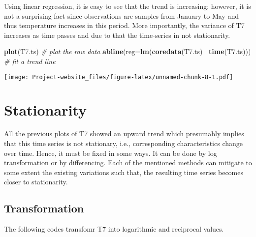 \documentclass[]{article}
\newenvironment{Shaded}{\begin{snugshade}}{\end{snugshade}}
\newcommand{\KeywordTok}[1]{\textcolor[rgb]{0.13,0.29,0.53}{\textbf{#1}}}
\newcommand{\DataTypeTok}[1]{\textcolor[rgb]{0.13,0.29,0.53}{#1}}
\newcommand{\CommentTok}[1]{\textcolor[rgb]{0.56,0.35,0.01}{\textit{#1}}}
\newcommand{\OperatorTok}[1]{\textcolor[rgb]{0.81,0.36,0.00}{\textbf{#1}}}
\newcommand{\NormalTok}[1]{#1}
\begin{document}
Using linear regression, it is easy to see that the trend is increasing;
however, it is not a surprising fact since observations are samples from
January to May and thus temperature increases in this period. More
importantly, the variance of T7 increases as time passes and due to that
the time-series in not stationarity.

\begin{Shaded}
\begin{Highlighting}[]
\KeywordTok{plot}\NormalTok{(T7.ts) }\CommentTok{# plot the raw data}
\KeywordTok{abline}\NormalTok{(}\DataTypeTok{reg=}\KeywordTok{lm}\NormalTok{(}\KeywordTok{coredata}\NormalTok{(T7.ts) }\OperatorTok{~}\KeywordTok{time}\NormalTok{(T7.ts))) }\CommentTok{# fit a trend line}
\end{Highlighting}
\end{Shaded}

\texttt{[image: Project-website\_files/figure-latex/unnamed-chunk-8-1.pdf]}

\section{Stationarity}\label{stationarity}

All the previous plots of T7 showed an upward trend which presumably
implies that this time series is not stationary, i.e., corresponding
characteristics change over time. Hence, it must be fixed in some ways.
It can be done by log transformation or by differencing. Each of the
mentioned methods can mitigate to some extent the existing variations
such that, the resulting time series becomes closer to stationarity.

\subsection{Transformation}\label{transformation}

The following codes transfomr T7 into logarithmic and reciprocal values.
\end{document}
